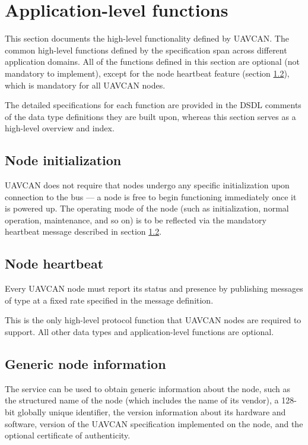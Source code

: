 \section{Application-level functions}\label{sec:application_level_functions}

This section documents the high-level functionality defined by UAVCAN.
The common high-level functions defined by the specification span across different application domains.
All of the functions defined in this section are optional (not mandatory to implement),
except for the node heartbeat feature (section \ref{sec:application_node_heartbeat}),
which is mandatory for all UAVCAN nodes.

The detailed specifications for each function are provided in the DSDL comments of the data type definitions
they are built upon, whereas this section serves as a high-level overview and index.

\subsection{Node initialization}

UAVCAN does not require that nodes undergo any specific initialization upon connection to the bus ---
a node is free to begin functioning immediately once it is powered up.
The operating mode of the node (such as initialization, normal operation, maintenance, and so on)
is to be reflected via the mandatory heartbeat message described in section \ref{sec:application_node_heartbeat}.

\subsection{Node heartbeat}\label{sec:application_node_heartbeat}

Every UAVCAN node must report its status and presence by publishing messages of type
 at a fixed rate specified in the message definition.

This is the only high-level protocol function that UAVCAN nodes are required to support.
All other data types and application-level functions are optional.


\subsection{Generic node information}

The service  can be used to obtain generic information about the node,
such as the structured name of the node (which includes the name of its vendor),
a 128-bit globally unique identifier, the version information about its hardware and software,
version of the UAVCAN specification implemented on the node, and the optional certificate of authenticity.

